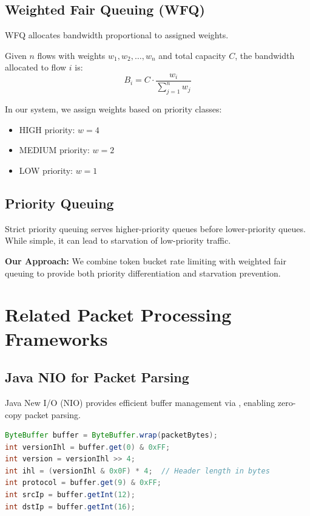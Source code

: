 \subsection{Weighted Fair Queuing (WFQ)}

WFQ allocates bandwidth proportional to assigned weights.

\begin{definition}
Given $n$ flows with weights $w_1, w_2, \ldots, w_n$ and total capacity $C$, the bandwidth allocated to flow $i$ is:
\begin{equation}
B_i = C \cdot \frac{w_i}{\sum_{j=1}^{n} w_j}
\end{equation}
\end{definition}

In our system, we assign weights based on priority classes:
\begin{itemize}
    \item HIGH priority: $w = 4$
    \item MEDIUM priority: $w = 2$
    \item LOW priority: $w = 1$
\end{itemize}

\subsection{Priority Queuing}

Strict priority queuing serves higher-priority queues before lower-priority queues. While simple, it can lead to starvation of low-priority traffic.

\textbf{Our Approach:} We combine token bucket rate limiting with weighted fair queuing to provide both priority differentiation and starvation prevention.

\section{Related Packet Processing Frameworks}
\label{sec:packet-processing}

\subsection{Java NIO for Packet Parsing}

Java New I/O (NIO) provides efficient buffer management via , enabling zero-copy packet parsing.

\begin{lstlisting}[language=Java, caption={IPv4 Header Parsing with ByteBuffer}, label={lst:ipv4-parse}]
ByteBuffer buffer = ByteBuffer.wrap(packetBytes);
int versionIhl = buffer.get(0) & 0xFF;
int version = versionIhl >> 4;
int ihl = (versionIhl & 0x0F) * 4;  // Header length in bytes
int protocol = buffer.get(9) & 0xFF;
int srcIp = buffer.getInt(12);
int dstIp = buffer.getInt(16);
\end{lstlisting}

